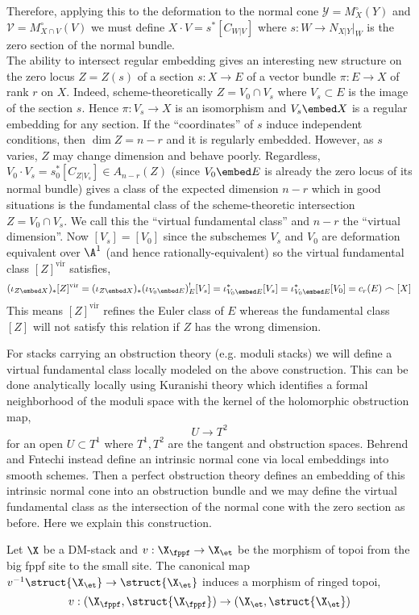 \documentclass[12pt]{article}
\newcommand{\vir}{\mathrm{vir}}
\begin{document}
Therefore, applying this to the deformation to the normal cone $\mathcal{Y} = M_X^\circ(Y)$ and $\mathcal{V} = M^\circ_{X \cap V}(V)$ we must define $X \cdot V = s^*[C_{W|V}]$ where $s : W \to N_{X|Y}|_W$ is the zero section of the normal bundle.
\bigskip\\
The ability to intersect regular embedding gives an interesting new structure on the zero locus $Z = Z(s)$ of a section $s : X \to E$ of a vector bundle $\pi : E \to X$ of rank $r$ on $X$. Indeed, scheme-theoretically $Z = V_0 \cap V_s$ where $V_s \subset E$ is the image of the section $s$. Hence $\pi : V_s \to X$ is an isomorphism and $V_s \embed X$ is a regular embedding for any section. If the ``coordinates'' of $s$ induce independent conditions, then $\dim{Z} = n - r$ and it is regularly embedded. However, as $s$ varies, $Z$ may change dimension and behave poorly. Regardless, $V_0 \cdot V_s = s_0^* [C_{Z|V_s}] \in A_{n-r}(Z)$ (since $V_0 \embed E$ is already the zero locus of its normal bundle) gives a class of the expected dimension $n-r$ which in good situations is the fundamental class of the scheme-theoretic intersection $Z = V_0 \cap V_s$. We call this the ``virtual fundamental class'' and $n - r$ the ``virtual dimension''. Now $[V_s] = [V_0]$ since the subschemes $V_s$ and $V_0$ are deformation equivalent over $\A^1$ (and hence rationally-equivalent) so the virtual fundamental class $[Z]^{\vir}$ satisfies,
\[ (\iota_{Z \embed X})_* [Z]^{\vir} = (\iota_{Z \embed X})_* (\iota_{V_0 \embed E})^!_{E} [V_s]  = \iota_{V_0 \embed E}^*[V_s]  = \iota_{V_0 \embed E}^*[V_0] = c_r(E) \frown [X] \]
This means $[Z]^{\vir}$ refines the Euler class of $E$ whereas the fundamental class $[Z]$ will not satisfy this relation if $Z$ has the wrong dimension.
\par
For stacks carrying an obstruction theory (e.g. moduli stacks) we will define a virtual fundamental class locally modeled on the above construction. This can be done analytically locally using Kuranishi theory which identifies a formal neighborhood of the moduli space with the kernel of the holomorphic obstruction map,
\[ U \to T^2 \]
for an open $U \subset T^1$ where $T^1, T^2$ are the tangent and obstruction spaces. Behrend and Fntechi instead define an intrinsic normal cone via local embeddings into smooth schemes. Then a perfect obstruction theory defines an embedding of this intrinsic normal cone into an obstruction bundle and we may define the virtual fundamental class as the intersection of the normal cone with the zero section as before. Here we explain this construction.
\par
Let $\X$ be a DM-stack and $v : \X_{\fppf} \to \X_{\et}$ be the morphism of topoi from the big fppf site to the small \etale site. The canonical map $v^{-1} \struct{\X_{\et}} \to \struct{\X_\et}$ induces a morphism of ringed topoi,
\[ v : (\X_{\fppf}, \struct{\X_{\fppf}}) \to (\X_{\et}, \struct{\X_{\et}}) \]
\end{document}

